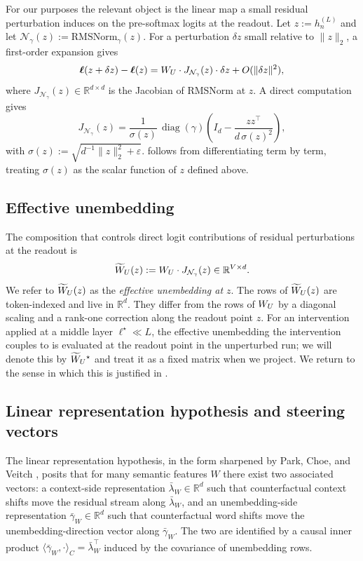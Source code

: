 \documentclass[11pt,letterpaper]{article}
\theoremstyle{plain}
\theoremstyle{definition}
\DeclareMathOperator{\diag}{diag}
\newcommand{\R}{\mathbb{R}}
\newcommand{\1}{\mathbf{1}}
\newcommand{\WU}{W_{U}\mathchoice{}{}{}{}}
\newcommand{\WUt}{\widetilde{W}_{U}\mathchoice{}{}{}{}}
\newcommand{\hres}{h}
\begin{document}
For our purposes the relevant object is the linear map a small residual perturbation induces on the pre-softmax logits at the readout. Let $z := \hres^{(L)}_n$ and let $\mathcal{N}_\gamma(z) := \mathrm{RMSNorm}_\gamma(z)$. For a perturbation $\delta z$ small relative to $\|z\|_2$, a first-order expansion gives
\begin{equation}
\bm{\ell}(z + \delta z) - \bm{\ell}(z) = \WU \cdot J_{\mathcal{N}_\gamma}(z) \cdot \delta z + O(\|\delta z\|^2),
\label{eq:firstorder}
\end{equation}
where $J_{\mathcal{N}_\gamma}(z) \in \R^{d \times d}$ is the Jacobian of RMSNorm at $z$. A direct computation gives
\begin{equation}
J_{\mathcal{N}_\gamma}(z) = \frac{1}{\sigma(z)}\,\diag(\gamma)\left(I_d - \frac{z z^\top}{d\,\sigma(z)^2}\right),
\label{eq:rmsjacobian}
\end{equation}
with $\sigma(z) := \sqrt{d^{-1}\|z\|_2^2 + \varepsilon}$.  follows from differentiating  term by term, treating $\sigma(z)$ as the scalar function of $z$ defined above.

\subsection{Effective unembedding}

The composition that controls direct logit contributions of residual perturbations at the readout is
\begin{equation}
\WUt(z) := \WU \cdot J_{\mathcal{N}_\gamma}(z) \in \R^{V \times d}.
\label{eq:effective}
\end{equation}
We refer to $\WUt(z)$ as the \emph{effective unembedding at $z$}. The rows of $\WUt(z)$ are token-indexed and live in $\R^d$. They differ from the rows of $\WU$ by a diagonal scaling and a rank-one correction along the readout point $z$. For an intervention applied at a middle layer $\ell^\star \ll L$, the effective unembedding the intervention couples to is evaluated at the readout point in the unperturbed run; we will denote this by $\WUt^\star$ and treat it as a fixed matrix when we project. We return to the sense in which this is justified in .

\subsection{Linear representation hypothesis and steering vectors}

The linear representation hypothesis, in the form sharpened by Park, Choe, and Veitch \cite{park2024linear}, posits that for many semantic features $W$ there exist two associated vectors: a context-side representation $\bar{\lambda}_W \in \R^d$ such that counterfactual context shifts move the residual stream along $\bar{\lambda}_W$, and an unembedding-side representation $\bar{\gamma}_W \in \R^d$ such that counterfactual word shifts move the unembedding-direction vector along $\bar{\gamma}_W$. The two are identified by a causal inner product $\langle \bar{\gamma}_W, \cdot\rangle_C = \bar{\lambda}_W^\top$ induced by the covariance of unembedding rows.
\end{document}
